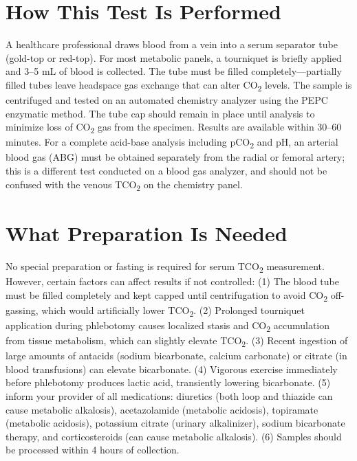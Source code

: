 \section*{How This Test Is Performed}
A healthcare professional draws blood from a vein into a serum separator tube (gold-top or red-top). For most metabolic panels, a tourniquet is briefly applied and 3--5 mL of blood is collected. The tube must be filled completely---partially filled tubes leave headspace gas exchange that can alter CO\textsubscript{2} levels. The sample is centrifuged and tested on an automated chemistry analyzer using the PEPC enzymatic method. The tube cap should remain in place until analysis to minimize loss of CO\textsubscript{2} gas from the specimen. Results are available within 30--60 minutes. For a complete acid-base analysis including pCO\textsubscript{2} and pH, an arterial blood gas (ABG) must be obtained separately from the radial or femoral artery; this is a different test conducted on a blood gas analyzer, and should not be confused with the venous TCO\textsubscript{2} on the chemistry panel.

\section*{What Preparation Is Needed}
No special preparation or fasting is required for serum TCO\textsubscript{2} measurement. However, certain factors can affect results if not controlled: (1) The blood tube must be filled completely and kept capped until centrifugation to avoid CO\textsubscript{2} off-gassing, which would artificially lower TCO\textsubscript{2}. (2) Prolonged tourniquet application during phlebotomy causes localized stasis and CO\textsubscript{2} accumulation from tissue metabolism, which can slightly elevate TCO\textsubscript{2}. (3) Recent ingestion of large amounts of antacids (sodium bicarbonate, calcium carbonate) or citrate (in blood transfusions) can elevate bicarbonate. (4) Vigorous exercise immediately before phlebotomy produces lactic acid, transiently lowering bicarbonate. (5) inform your provider of all medications: diuretics (both loop and thiazide can cause metabolic alkalosis), acetazolamide (metabolic acidosis), topiramate (metabolic acidosis), potassium citrate (urinary alkalinizer), sodium bicarbonate therapy, and corticosteroids (can cause metabolic alkalosis). (6) Samples should be processed within 4 hours of collection.

